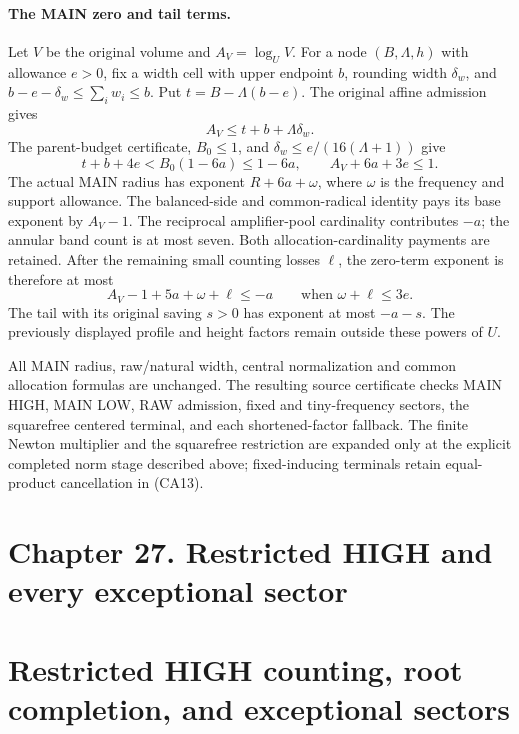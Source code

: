 \paragraph{The MAIN zero and tail terms.}
Let \(V\) be the original volume and \(A_V=\log_U V\). For a node
\((B,\Lambda,h)\) with allowance \(e>0\), fix a width cell with
upper endpoint \(b\), rounding width \(\delta_w\), and
\(b-e-\delta_w\le\sum_iw_i\le b\). Put
\(t=B-\Lambda(b-e)\). The original affine admission gives
\[
 A_V\le t+b+\Lambda\delta_w.
\]
The parent-budget certificate, \(B_0\le1\), and
\(\delta_w\le e/(16(\Lambda+1))\) give
\[
 t+b+4e<B_0(1-6a)\le1-6a,
 \qquad A_V+6a+3e\le1.
\]
The actual MAIN radius has exponent \(R+6a+\omega\), where
\(\omega\) is the frequency and support allowance. The balanced-side
and common-radical identity pays its base exponent by \(A_V-1\).
The reciprocal amplifier-pool cardinality contributes \(-a\); the
annular band count is at most seven. Both allocation-cardinality
payments are retained. After the remaining small counting losses
\(\ell\), the zero-term exponent is therefore at most
\[
 A_V-1+5a+\omega+\ell\le-a
 \qquad\text{when }\omega+\ell\le3e.
\]
The tail with its original saving \(s>0\) has exponent at most
\(-a-s\). The previously displayed profile and height factors remain
outside these powers of \(U\).

All MAIN radius, raw/natural width, central normalization and common allocation formulas are unchanged. The resulting source certificate checks MAIN HIGH, MAIN LOW, RAW admission, fixed and tiny-frequency sectors, the squarefree centered terminal, and each shortened-factor fallback. The finite Newton multiplier and the squarefree restriction are expanded only at the explicit completed norm stage described above; fixed-inducing terminals retain equal-product cancellation in (CA13).

\hypertarget{sources:chapter-27.-restricted-high-and-every-exceptional-sector}{%
\section{Chapter 27. Restricted HIGH and every exceptional sector}\label{sources:chapter-27.-restricted-high-and-every-exceptional-sector}}

\hypertarget{sources:restricted-high-counting-root-completion-and-exceptional-sectors}{%
\section{Restricted HIGH counting, root completion, and exceptional sectors}\label{sources:restricted-high-counting-root-completion-and-exceptional-sectors}}

